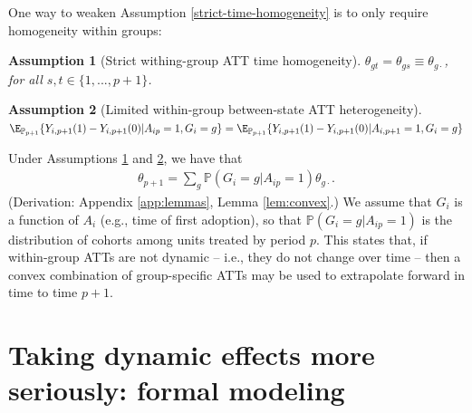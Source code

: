 \documentclass{article}
\newtheorem{assumption}{Assumption}
\renewcommand{\P}{\mathbb{P}}
\begin{document}
One way to weaken Assumption \ref{strict-time-homogeneity} is to only require homogeneity within groups:
\begin{assumption}[Strict withing-group ATT time homogeneity]
    $\theta_{gt} = \theta_{gs} \equiv \theta_{g\cdot}$, for all $s, t \in \{1, ..., p+1\}$.\label{within-group-strict-time-homogeneity}
\end{assumption}
\begin{assumption}[Limited within-group between-state ATT heterogeneity]
    $\E_{\P_{p+1}}\{Y_{i,p+1}(1) - Y_{i,p+1}(0) | A_{ip} = 1, G_i = g\} = \E_{\P_{p+1}}\{Y_{i,p+1}(1) - Y_{i,p+1}(0) | A_{i,p+1} = 1, G_i = g\}$\label{within-group-p-to-p-plus-one-heterogeneity}
\end{assumption}
Under Assumptions \ref{within-group-strict-time-homogeneity} and \ref{within-group-p-to-p-plus-one-heterogeneity}, we have that
\begin{align*}
    \theta_{p+1} = \sum_g\P(G_i = g | A_{ip} = 1)\theta_{g\cdot}.
\end{align*}
(Derivation: Appendix \ref{app:lemmas}, Lemma \ref{lem:convex}.)
We assume that $G_i$ is a function of $A_i$ (e.g., time of first adoption), so that $\P(G_i=g|A_{ip}=1)$ is the distribution of cohorts among units treated by period $p$.
This states that, if within-group ATTs are not dynamic -- i.e., they do not change over time -- then a convex combination of group-specific ATTs may be used to extrapolate forward in time to time $p+1$. 

\section{Taking dynamic effects more seriously: formal modeling}
\end{document}
